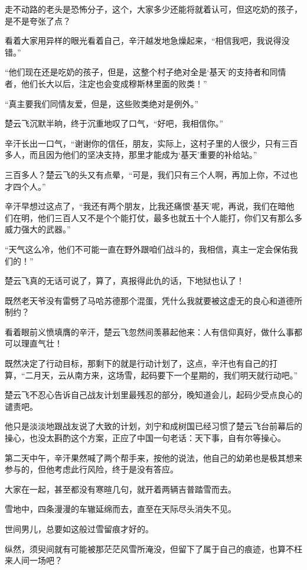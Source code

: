 走不动路的老头是恐怖分子，这个，大家多少还能将就着认可，但这吃奶的孩子，是不是夸张了点？

看着大家用异样的眼光看着自己，辛汗越发地急燥起来，“相信我吧，我说得没错。”

“他们现在还是吃奶的孩子，但是，这整个村子绝对全是‘基天’的支持者和同情者，他们长大以后，注定也会变成穆斯林里面的败类！”

“真主要我们同情友爱，但是，这些败类绝对是例外。”

楚云飞沉默半晌，终于沉重地叹了口气，“好吧，我相信你。”

辛汗长出一口气，“谢谢你的信任，朋友，实际上，这村子里的人很少，只有三百多人，而且因为他们的坚决支持，那里才能成为‘基天’重要的补给站。”

三百多人？楚云飞的头又有点晕，“可是，我们只有三个人啊，再加上你，不过也才四个人。”

辛汗早想过这点了，“我还有两个朋友，比我还痛恨‘基天’呢，再说，我们在暗他们在明，他们三百人又不是个个能打仗，最多也就五十个人能打，你们又有那么多威力强大的武器。”

“天气这么冷，他们不可能一直在野外跟咱们战斗的，我相信，真主一定会保佑我们的！”

楚云飞真的无话可说了，算了，真报得此仇的话，下地狱也认了！

既然老天爷没有雷劈了马哈苏德那个混蛋，凭什么我就要被这虚无的良心和道德所制约？

看着眼前义愤填膺的辛汗，楚云飞忽然间羡慕起他来：人有信仰真好，做什么事都可以理直气壮！

既然决定了行动目标，那剩下的就是行动计划了，这点，辛汗也有自己的打算，“二月天，云从南方来，这场雪，起码要下一个星期的，我们明天就行动吧。”

楚云飞不忍心告诉自己战友计划里最残忍的部分，晚知道会儿，起码少受点良心的谴责吧。

他只是淡淡地跟战友说了大致的计划，刘宁和成树国已经习惯了楚云飞台前幕后的操心，也没太斟酌这个方案，正应了中国一句老话：天下事，自有尔等操心。

第二天中午，辛汗果然喊了两个帮手来，按他的说法，他自己的幼弟也是极其想来参与的，但他考虑此行风险，终于是没有答应。

大家在一起，甚至都没有寒暄几句，就开着两辆吉普踏雪而去。

雪地中，四条漫漫的车辙延绵而去，直至在天际尽头消失不见。

世间男儿，总要如这般过雪留痕才好的。

纵然，须臾间就有可能被那茫茫风雪所淹没，但留下了属于自己的痕迹，也算不枉来人间一场吧？

